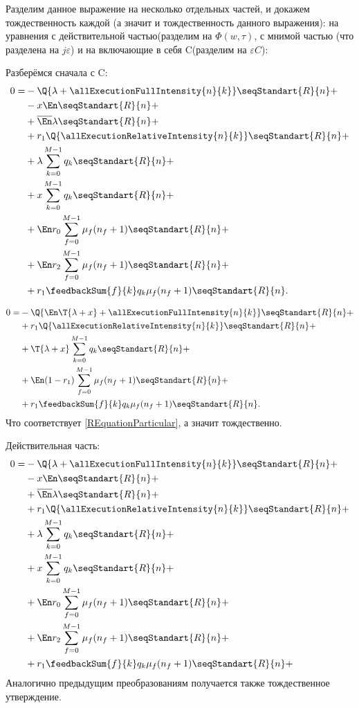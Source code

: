 Разделим данное выражение на несколько отдельных частей, 
и докажем тождественность каждой 
(а значит и тождественность данного выражения):
на уравнения с действительной частью(разделим на \(\Phi(w,\tau)\), 
с мнимой частью (что разделена на \(j \varepsilon \))
и на включающие в себя C(разделим на \(\varepsilon C\)):

Разберёмся сначала с C:
{\allowdisplaybreaks\begin{align*}
0=
    &-\Q{\lambda+\allExecutionFullIntensity{n}{k}} \seqStandart{R}{n}+\\
    &-x \En \seqStandart{R}{n} + \\
    &+\overline{\En} \lambda  \seqStandart{R}{n}+\\    
    &+r_1 \Q{\allExecutionRelativeIntensity{n}{k}}\seqStandart{R}{n}+\\
    &+\lambda\sum_{k=0}^{M-1}q_k \seqStandart{R}{n}+\\
    &+x \sum_{k=0}^{M-1}q_k \seqStandart{R}{n}+\\
    &+\En r_0 \sum_{f=0}^{M-1} \mu_f (n_f + 1)\seqStandart{R}{n}+\\
    &+\En r_2 \sum_{f=0}^{M-1} \mu_f (n_f + 1)\seqStandart{R}{n}+\\
    &+r_1 \feedbackSum{f}{k} q_k \mu_f (n_f+1)\seqStandart{R}{n}.
\end{align*}}

{\allowdisplaybreaks\begin{align*}
0=
    &-\Q{\En\T{\lambda + x}+\allExecutionFullIntensity{n}{k}} 
        \seqStandart{R}{n}+\\
    &+r_1 \Q{\allExecutionRelativeIntensity{n}{k}}\seqStandart{R}{n}+\\
    &+\T{\lambda + x} \sum_{k=0}^{M-1}q_k \seqStandart{R}{n}+\\
    &+\En (1 - r_1) \sum_{f=0}^{M-1} \mu_f (n_f + 1)\seqStandart{R}{n}+\\
    &+r_1 \feedbackSum{f}{k} q_k \mu_f (n_f+1)\seqStandart{R}{n}.
\end{align*}}
Что соответствует \eqref{REquationParticular}, а значит тождественно.

Действительная часть:
{\allowdisplaybreaks\begin{align*}
0 = 
    &-\Q{\lambda+\allExecutionFullIntensity{n}{k}}\seqStandart{R}{n}+\\
    &-x \En \seqStandart{R}{n} + \\
    &+\overline{\En} \lambda \seqStandart{R}{n}+\\
    &+r_1 \Q{\allExecutionRelativeIntensity{n}{k}} \seqStandart{R}{n}+\\
    &+\lambda\sum_{k=0}^{M-1}q_k \seqStandart{R}{n}+\\
    &+x \sum_{k=0}^{M-1}q_k \seqStandart{R}{n}+\\
    &+\En r_0 \sum_{f=0}^{M-1} \mu_f (n_f + 1)\seqStandart{R}{n}+\\
    &+\En r_2 \sum_{f=0}^{M-1} \mu_f (n_f + 1)\seqStandart{R}{n}+\\
    &+r_1 \feedbackSum{f}{k} q_k \mu_f (n_f+1)\seqStandart{R}{n}+\\
\end{align*}}
Аналогично предыдущим преобразованиям получается 
также тождественное утверждение.

